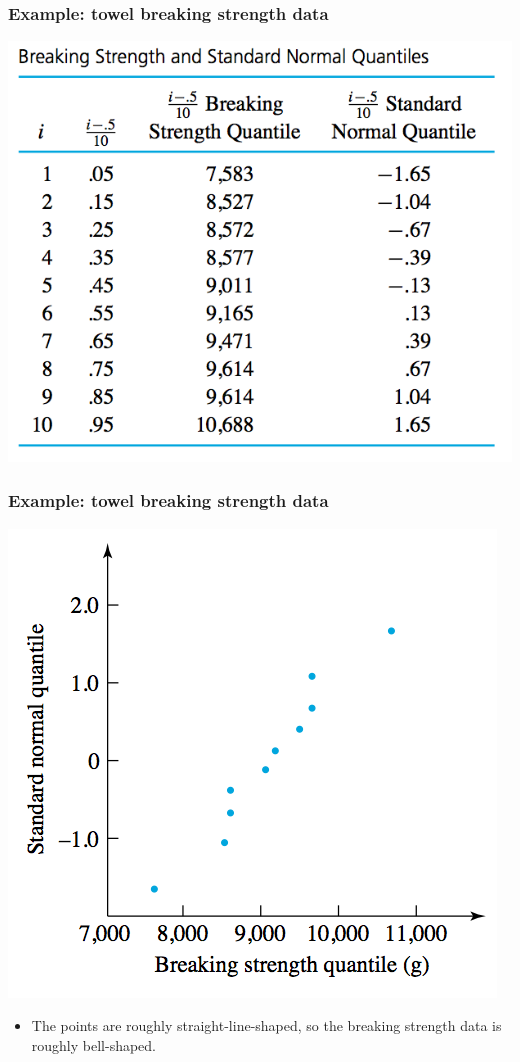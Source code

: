 \documentclass{beamer}\usepackage{graphicx, color}
\numberwithin{equation}{section}
\begin{document}
\begin{frame}
\frametitle{Example: towel breaking strength data}
\begin{center}
 \includegraphics{../../fig/towelqqdata.png}
\end{center}
\end{frame}

\begin{frame}
\frametitle{Example: towel breaking strength data}
\begin{center}
 \includegraphics{../../fig/towelqqplot.png}
\end{center}

\begin{itemize}
\item The points are roughly straight-line-shaped, so the breaking strength data is roughly bell-shaped.
\end{itemize}
\end{frame}
\end{document}
